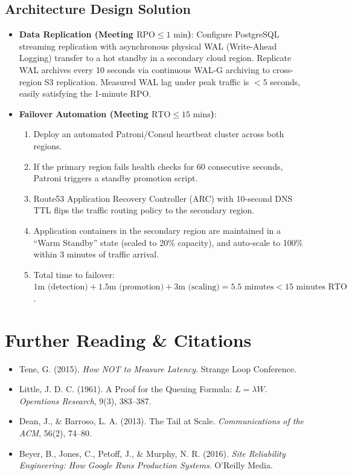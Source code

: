 \subsection*{Architecture Design Solution}
\begin{itemize}[leftmargin=18pt]
  \item \textbf{Data Replication (Meeting $\text{RPO} \le 1\text{ min}$)}: Configure PostgreSQL streaming replication with asynchronous physical WAL (Write-Ahead Logging) transfer to a hot standby in a secondary cloud region. Replicate WAL archives every 10 seconds via continuous WAL-G archiving to cross-region S3 replication. Measured WAL lag under peak traffic is $<5$ seconds, easily satisfying the 1-minute RPO.
  \item \textbf{Failover Automation (Meeting $\text{RTO} \le 15\text{ mins}$)}:
  \begin{enumerate}
    \item Deploy an automated Patroni/Consul heartbeat cluster across both regions.
    \item If the primary region fails health checks for 60 consecutive seconds, Patroni triggers a standby promotion script.
    \item Route53 Application Recovery Controller (ARC) with 10-second DNS TTL flips the traffic routing policy to the secondary region.
    \item Application containers in the secondary region are maintained in a ``Warm Standby'' state (scaled to 20\% capacity), and auto-scale to 100\% within 3 minutes of traffic arrival.
    \item Total time to failover: $1\text{m (detection)} + 1.5\text{m (promotion)} + 3\text{m (scaling)} = 5.5\text{ minutes} < 15\text{ minutes RTO}$.
  \end{enumerate}
\end{itemize}

\section{Further Reading \protect\& Citations}
\begin{itemize}[leftmargin=18pt]
  \item Tene, G. (2015). \textit{How NOT to Measure Latency}. Strange Loop Conference.
  \item Little, J. D. C. (1961). A Proof for the Queuing Formula: $L = \lambda W$. \textit{Operations Research}, 9(3), 383--387.
  \item Dean, J., \& Barroso, L. A. (2013). The Tail at Scale. \textit{Communications of the ACM}, 56(2), 74--80.
  \item Beyer, B., Jones, C., Petoff, J., \& Murphy, N. R. (2016). \textit{Site Reliability Engineering: How Google Runs Production Systems}. O'Reilly Media.
\end{itemize}
